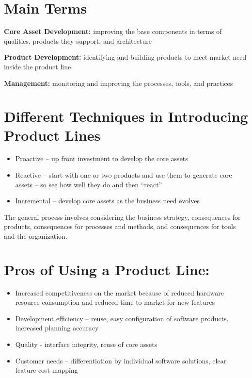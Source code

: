 \documentclass[a4paper]{report}
\begin{document}
\section{Main Terms}
\textbf{Core Asset Development:} improving the base components in terms of qualities, products they support, and architecture

\textbf{Product Development:} identifying and building products to meet market need inside the product line

\textbf{Management:} monitoring and improving the processes, tools, and practices

\section{Different Techniques in Introducing Product Lines}
\begin{itemize}
\item Proactive – up front investment to develop the core assets
\item Reactive – start with one or two products and use them to generate core assets – so see how well they do and then “react”
\item Incremental – develop core assets as the business need evolves
\end{itemize}
The general process involves considering the business strategy, consequences for products, consequences for processes and methods, and consequences for tools and the organization.

\section{Pros of Using a Product Line:}
\begin{itemize}
\item Increased competitiveness on the market because of reduced hardware resource consumption and reduced time to market for new features
\item Development efficiency – reuse, easy configuration of software products, increased planning accuracy
\item Quality  - interface integrity, reuse of core assets
\item Customer needs – differentiation by individual software solutions, clear feature-cost mapping
\end{itemize}
\end{document}
